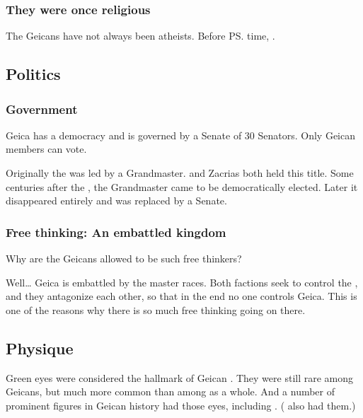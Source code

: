 \subsubsection{They were once religious}
The Geicans have not always been atheists. 
Before \ps{\Belzir}{} time, . 










\subsection{Politics}
\subsubsection{Government}
Geica has a democracy and is governed by a Senate of 30 Senators. Only Geican \vclan members can vote. 

Originally the \vclan was led by a Grandmaster. 
\Belzir{} and Zacrias both held this title. 
Some centuries after the \Darkfall, the Grandmaster came to be democratically elected. 
Later it disappeared entirely and was replaced by a Senate. 





\subsubsection{Free thinking: An embattled kingdom}
Why are the Geicans allowed to be such free thinkers? 

Well\ldots{} Geica is embattled by the master races. Both factions seek to control the \vclan {}, and they antagonize each other, so that in the end no one controls Geica. This is one of the reasons why there is so much free thinking going on there. 









\subsection{Physique}
Green eyes were considered the hallmark of Geican \humans.
They were still rare among Geicans, but much more common than among \humans as a whole.
And a number of prominent figures in Geican history had those eyes, including . 
( also had them.)









